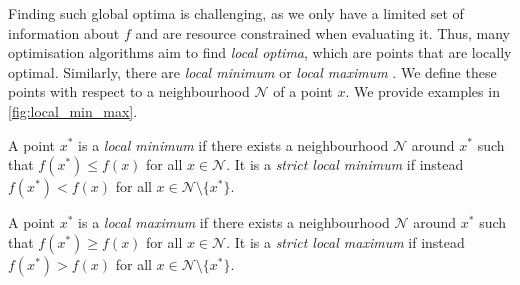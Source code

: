 Finding such global optima is challenging, as we only have a limited set of information about $f$ and are resource constrained when evaluating it. Thus, many optimisation algorithms aim to find \textit{local optima}, which are points that are locally optimal. Similarly, there are \textit{local minimum} or \textit{local maximum} \citep{NoceWrig06, deep_learning_book}. We define these points with respect to a neighbourhood $\mathcal{N}$ of a point $x$. We provide examples in \cref{fig:local_min_max}.

\begin{definition}
    A point $x^*$ is a \textit{local minimum} if there exists a neighbourhood $\mathcal{N}$ around $x^*$ such that $f(x^*) \leq f(x)$ for all $x \in \mathcal{N}$. It is a \textit{strict local minimum} if instead $f(x^*) < f(x)$ for all $x \in \mathcal{N} \setminus \{x^*\}$.
\end{definition}

\begin{definition}
    A point $x^*$ is a \textit{local maximum} if there exists a neighbourhood $\mathcal{N}$ around $x^*$ such that $f(x^*) \geq f(x)$ for all $x \in \mathcal{N}$. It is a \textit{strict local maximum} if instead $f(x^*) > f(x)$ for all $x \in \mathcal{N} \setminus \{x^*\}$.
\end{definition}


